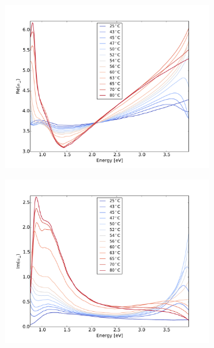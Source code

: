 %
%
\begin{figure}
    \centering
    \begin{subfigure}[b]{0.49\textwidth}
        \centering
        \includegraphics[width=\textwidth]{Results/Sim2/re_alpha_perp.pdf}
        \caption{}
        \label{fig:}
    \end{subfigure}
    \begin{subfigure}[b]{0.49\textwidth}
        \centering
        \includegraphics[width=\textwidth]{Results/Sim2/im_alpha_perp.pdf}
        \caption{}
        \label{fig:}
    \end{subfigure}

\end{figure}
